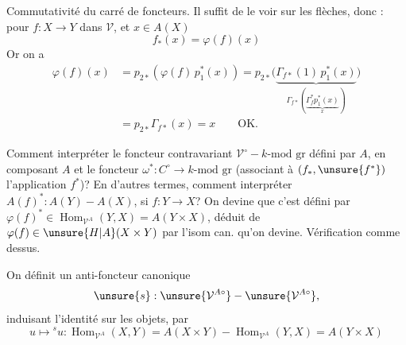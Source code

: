 Commutativité du carré de foncteurs.
Il suffit de le voir sur les flèches, donc : 
pour $f:X\longrightarrow Y$ dans $\mathcal V$, et $x\in A(X)$
\[
f_*(x)=\varphi(f)(x)
\]
Or on a
\[
\begin{aligned}
\varphi(f)(x)&=p_{2*}(\varphi(f)\,p_1^*(x))
=p_{2*}\bigl(\underbrace{\Gamma_{f*}(1)\,p_1^*(x)}_{\Gamma_{f*}(\underbrace{\Gamma_f^*p_1^*(x)}_x)}\bigr)\\
&=p_{2*}\Gamma_{f*}(x)=x\qquad\mathrm{OK}.
\end{aligned}
\]

Comment interpréter le foncteur
contravariant $\mathcal V^\circ-k\text{-mod gr}$ défini par $A$,
en composant $A$ et le foncteur $\omega^*:C^\circ\longrightarrow k\text{-mod gr}$
(associant à $(f_*,\unsure{f^*})$ l'application $f^*$)? En d'autres
termes, comment interpréter $A(f)^*:A(Y)-A(X)$,
si $f:Y\longrightarrow X$? On devine que c'est défini
par $\varphi(f)^*\in\operatorname{Hom}_{\mathcal V^A}(Y,X)=A(Y\times X)$, déduit
de $\varphi(f)\in\unsure{H|A}(X\times Y)$ par l'isom can. qu'on
devine. Vérification comme dessus.

On définit un anti-foncteur canonique
\[
\unsure{s}:\unsure{\mathcal V^{A\circ}}-\unsure{\mathcal V^{A\circ}},
\]
induisant l'identité sur les objets, par
\[
u\longmapsto{}^su:\operatorname{Hom}_{\mathcal V^A}(X,Y)=A(X\times Y)-\operatorname{Hom}_{\mathcal V^A}(Y,X)=A(Y\times X)
\]
